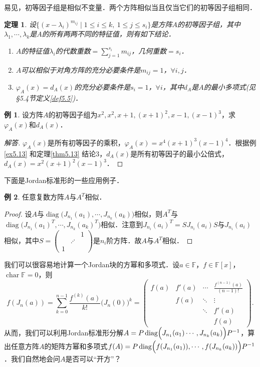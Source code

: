 \documentclass[a4paper,fontset=windows]{ctexbook}
\newtheorem{theorem}{定理}[chapter]
\theoremstyle{definition}
\newtheorem{example}{例}[chapter]
\DeclareMathOperator{\Char}{char}
\DeclareMathOperator{\diag}{diag}
\renewcommand{\le}{\leqslant}
\begin{document}
易见，初等因子组是相似不变量．两个方阵相似当且仅当它们的初等因子组相同．

\begin{theorem}\label{thm5.12}
设$\{(x-\lambda_i)^{m_{ij}}\mid 1\le i\le k,~1\le j\le s_i\}$是方阵$A$的初等因子组，其中$\lambda_1,\cdots,\lambda_k$是$A$的所有两两不同的特征值，则有如下结论．
\begin{enumerate}
\item $A$的特征值$\lambda_i$的代数重数$=\sum\limits_{j=1}^{s_i}m_{ij}$，几何重数$=s_i$．

\item $A$可以相似于对角方阵的充分必要条件是$m_{ij}=1$，$\forall i,j$．

\item $\varphi_A(x)=d_A(x)$的充分必要条件是$s_i=1$，$\forall i$，其中$d_A$是$A$的最小多项式(见\S 5.4节定义\ref{def5.5})．
\end{enumerate}
\end{theorem}

\begin{example}
设方阵$A$的初等因子组为$x^2,x^2,x+1,(x+1)^2,x-1,(x-1)^3$，求$\varphi_A(x)$和$d_A(x)$．
\end{example}

\begin{proof}[解答]
$\varphi_A(x)$是所有初等因子的乘积，$\varphi_A(x)=x^4(x+1)^3(x-1)^4$．根据例\ref{ex5.13} 和定理\ref{thm5.13} 结论3，$d_A(x)$是所有初等因子的最小公倍式，$d_A(x)=x^2(x+1)^2(x-1)^3$．
\end{proof}

下面是Jordan标准形的一些应用例子．

\begin{example}\label{ex5.9}
任意复数方阵$A$与$A^T$相似．
\end{example}

\begin{proof}
设$A$与$\diag\bigl(J_{n_1}(a_1),\cdots,J_{n_k}(a_k)\bigr)$相似，则$A^T$与$\diag\bigl(J_{n_1}(a_1)^T,\cdots,J_{n_k}(a_k)^T\bigr)$相似．注意到$J_{n_i}(a_i)^T=SJ_{n_i}(a_i)S$与$J_{n_i}(a_i)$相似，其中$S=\left(\begin{smallmatrix}&&1 \\ &\iddots& \\ 1&&\end{smallmatrix}\right)$是$n_i$阶方阵．故$A$与$A^T$相似．
\end{proof}

我们可以很容易地计算一个Jordan块的方幂和多项式．设$a\in\mathbb{F}$，$f\in\mathbb{F}[x]$，$\Char\mathbb{F}=0$，则
$$f(J_n(a))=\sum_{k=0}^{n-1}\frac{f^{(k)}(a)}{k!}\bigl(J_n(0)\bigr)^k=\begin{pmatrix}f(a)&f'(a)&\cdots&\frac{f^{(n-1)}(a)}{(n-1)!} \\ &f(a)&\ddots&\vdots \\ &&\ddots&f'(a) \\ &&&f(a)\end{pmatrix}.$$
从而，我们可以利用Jordan标准形分解$A=P\diag\Bigl(J_{n_1}(a_1)\cdots,J_{n_k}(a_k)\Bigr)P^{-1}$，算出任意方阵$A$的矩阵方幂和多项式$f(A)=P\diag\Bigl(f(J_{n_1}(a_1)),\cdots,f(J_{n_k}(a_k))\Bigr)P^{-1}$．我们自然地会问$A$是否可以“开方”？
\end{document}
